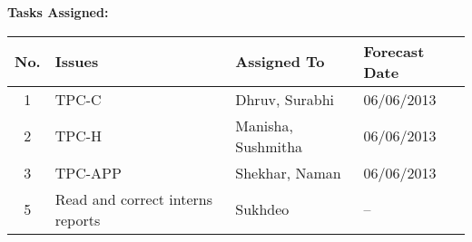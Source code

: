 \documentclass[a4paper,12pt]{article}
\begin{document}
\pagebreak

\vskip20pt

\textbf{Tasks Assigned:}
\vskip10pt
\begin{tabular}{|c|p{6cm}|p{3cm}|p{4cm}|}
 \hline
 \hline
 \textbf{No.} & \textbf{Issues} & \textbf{Assigned To} & \textbf{Forecast Date} \\
  \hline
  \hline
1 & TPC-C & Dhruv, Surabhi & 06/06/2013 \\
  \hline
2 & TPC-H & Manisha, Sushmitha & 06/06/2013 \\
  \hline
3 & TPC-APP & Shekhar, Naman & 06/06/2013 \\
  \hline
5 & Read and correct interns reports & Sukhdeo & -- \\
  \hline
\end{tabular}
\end{document}
